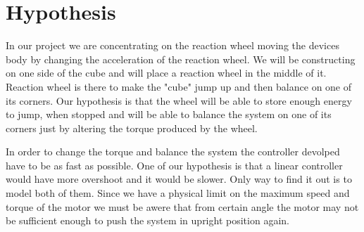 \section{Hypothesis}

In our project we are concentrating on the reaction wheel moving the devices body by changing the acceleration of the reaction wheel.
We will be constructing on one side of the cube and will place a reaction wheel in the middle of it.
Reaction wheel is there to make the "cube" jump up and then balance on one of its corners.
Our hypothesis is that the wheel will be able to store enough energy to jump, when stopped and will be able to balance the system on one of its corners just by altering the torque produced by the wheel.

In order to change the torque and balance the system the controller devolped have to be as fast as possible.
One of our hypothesis is that a linear controller would have more overshoot and it would be slower.
Only way to find it out is to model both of them.
Since we have a physical limit on the maximum speed and torque of the motor we must be awere that from certain angle the motor may not be sufficient enough to push the system in upright position again.


